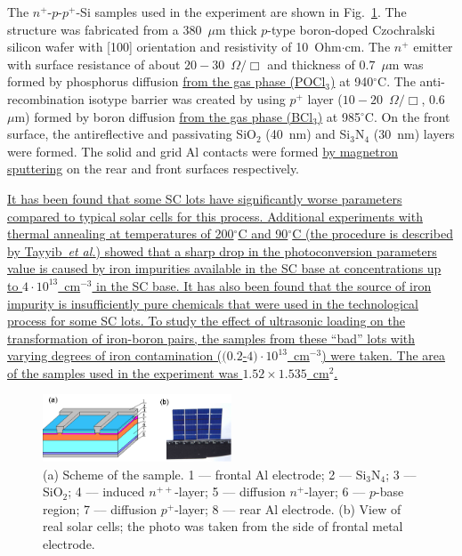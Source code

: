 \documentclass[%
 aip,jap,
 amsmath,amssymb,
 reprint,%
]{revtex4-1}
\begin{document}
The $n^+$-$p$-$p^+$-Si samples used in the experiment are shown in Fig.~\ref{Fig:sample}.
The structure was fabricated from a 380~$\mu$m thick $p$-type boron-doped
Czochralski silicon wafer with [100] orientation and resistivity of 10~Ohm$\cdot$cm.
The $n^+$ emitter with surface resistance of about $20-30$~$\Omega/\Box$
and  thickness of $0.7$~$\mu$m was formed by phosphorus diffusion \textcolor[rgb]{0.00,0.07,1.00}{\uline{from the gas phase (POCl$_3$)}}
at 940$^\circ$C.
The anti-recombination isotype barrier was created by using $p^+$
layer ($10-20$~$\Omega/\Box$, $0.6$~$\mu$m) formed by boron diffusion
\textcolor[rgb]{0.00,0.07,1.00}{\uline{from the gas phase (BCl$_3$)}}
at 985$^\circ$C.
On the front surface, the antireflective and passivating SiO$_2$ (40~nm) and Si$_3$N$_4$ (30~nm) layers
were formed.
The solid and grid Al contacts were formed
\textcolor[rgb]{0.00,0.07,1.00}{\uline{by magnetron sputtering}}
on the rear and front surfaces respectively.


\textcolor[rgb]{0.00,0.07,1.00}{\uline{
It has been found that some SC lots have significantly worse parameters compared to typical solar cells for this process.
Additional experiments with thermal annealing at temperatures of 200$^\circ$C and 90$^\circ$C
(the procedure is described by Tayyib~\emph{et al.}\cite{TAYYIB201221})
showed that a sharp drop in the photoconversion parameters value
is caused by iron impurities available in the SC base at concentrations up to $4\cdot10^{13}$~cm$^{-3}$ in the SC base.
It has also been found that the source of iron impurity is insufficiently pure chemicals that were used in the technological process for some SC lots.
To study the effect of ultrasonic loading on the transformation  of iron-boron pairs, the samples from these ``bad'' lots with varying degrees of iron contamination ($(0.2$-$4)\cdot10^{13}$~cm$^{-3}$) were taken.
The area of the samples used in the experiment was $1.52\times1.535$~cm$^2$.
}}




\begin{figure}
\includegraphics[width=0.5\textwidth]{Fig1}%
\caption{\label{Fig:sample}
(a) Scheme of the sample.
1 –-- frontal Al electrode;
2 –-- Si$_3$N$_4$;
3 –-- SiO$_2$;
4 –-- induced $n^{++}$-layer;
5 –-- diffusion $n^+$-layer;
6 –-- $p$-base region;
7 –-- diffusion $p^+$-layer;
8 –-- rear Al electrode.
(b) View of real solar cells;
the photo was taken from the side of frontal metal electrode.
}
\end{figure}
\end{document}

